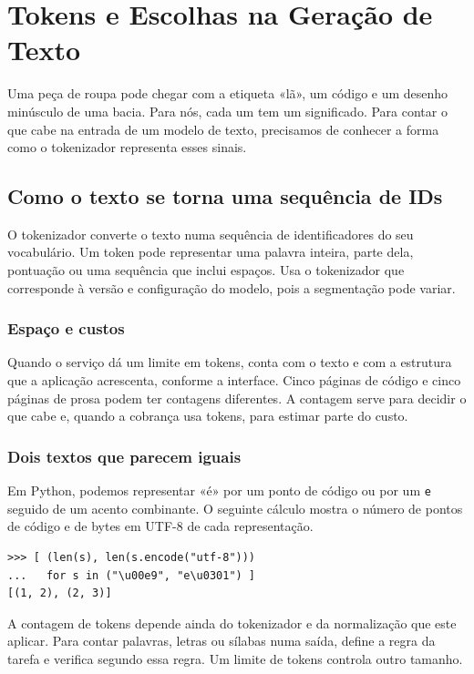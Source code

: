 \chapter{Tokens e Escolhas na Geração de Texto}
\label{ch:tokens}

Uma peça de roupa pode chegar com a etiqueta «lã», um código e um desenho minúsculo de uma bacia. Para nós, cada um tem um significado. Para contar o que cabe na entrada de um modelo de texto, precisamos de conhecer a forma como o tokenizador representa esses sinais.

\section{Como o texto se torna uma sequência de IDs}
O tokenizador converte o texto numa sequência de identificadores do seu vocabulário. Um token pode representar uma palavra inteira, parte dela, pontuação ou uma sequência que inclui espaços. Usa o tokenizador que corresponde à versão e configuração do modelo, pois a segmentação pode variar.

\subsection*{Espaço e custos}
Quando o serviço dá um limite em tokens, conta com o texto e com a estrutura que a aplicação acrescenta, conforme a interface. Cinco páginas de código e cinco páginas de prosa podem ter contagens diferentes. A contagem serve para decidir o que cabe e, quando a cobrança usa tokens, para estimar parte do custo.

\subsection*{Dois textos que parecem iguais}
Em Python, podemos representar «é» por um ponto de código ou por um \texttt{e} seguido de um acento combinante. O seguinte cálculo mostra o número de pontos de código e de bytes em UTF-8 de cada representação.

\begin{lstlisting}
>>> [ (len(s), len(s.encode("utf-8")))
...   for s in ("\u00e9", "e\u0301") ]
[(1, 2), (2, 3)]
\end{lstlisting}

A contagem de tokens depende ainda do tokenizador e da normalização que este aplicar. Para contar palavras, letras ou sílabas numa saída, define a regra da tarefa e verifica segundo essa regra. Um limite de tokens controla outro tamanho.

